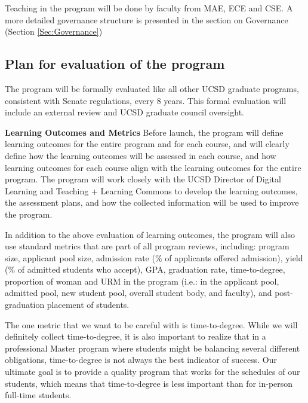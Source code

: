 \documentclass[11pt,letterpaper]{article}
\begin{document}
Teaching in the program will be done by faculty from MAE, ECE and CSE.
A more detailed governance structure is presented in the section on
Governance (Section \ref{Sec:Governance})

\subsection{Plan for evaluation of the program}

The program will be formally evaluated like all other UCSD graduate
programs, consistent with Senate regulations, every 8 years. This
formal evaluation will include an external review and UCSD graduate
council oversight.

{\bf Learning Outcomes and Metrics}​ Before launch, the program will
define learning outcomes for the entire program and for each course,
and will clearly define how the learning outcomes will be assessed in
each course, and how learning outcomes for each course align with the
learning outcomes for the entire program. The program will work
closely with the UCSD Director of Digital Learning and Teaching +
Learning Commons to develop the learning outcomes, the assessment
plans, and how the collected information will be used to improve the
program.

In addition to the above evaluation of learning outcomes, the program
will also use standard metrics that are part of all program reviews,
including: program size, applicant pool size, admission rate (\% of
applicants offered admission), yield (\% of admitted students who
accept), GPA, graduation rate, time-to-degree, proportion of woman and
URM in the program (i.e.: in the applicant pool, admitted pool, new
student pool, overall student body, and faculty), and post-graduation
placement of students.

The one metric that we want to be careful with is time-to-degree.
While we will definitely collect time-to-degree, it is also important
to realize that in a professional Master program where students might
be balancing several different obligations, time-to-degree is not
always the best indicator of success. Our ultimate goal is to provide
a quality program that works for the schedules of our students, which
means that time-to-degree is less important than for in-person
full-time students.
\end{document}

